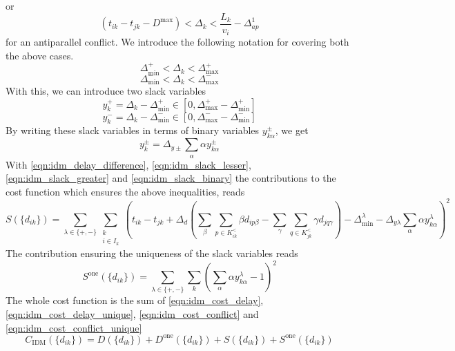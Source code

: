 \documentclass{article}
\begin{document}
or
\begin{equation*} \label{eqn:idm_slack_lesser_antiparallel}
     (t_{ik} - t_{jk} - D^{\text{max}}) < \Delta_k < \frac{L_k}{v_i} - \Delta^1_{ap}
\end{equation*}
for an antiparallel conflict.
We introduce the following notation for covering both the above cases.
\begin{equation*} \label{eqn:idm_slack_greater}
    \Delta^+_\text{min} < \Delta_k < \Delta^+_\text{max}
\end{equation*}
\begin{equation*} \label{eqn:idm_slack_lesser}
    \Delta^-_\text{min} < \Delta_k < \Delta^-_\text{max}
\end{equation*}
With this, we can introduce two slack variables
\begin{equation} \label{eqn:idm_slack_greater}
    y^+_k =  \Delta_k - \Delta^+_\text{min} \in [0, \Delta^+_\text{max} - \Delta^+_\text{min}]
\end{equation}
\begin{equation} \label{eqn:idm_slack_lesser}
    y^-_k =  \Delta_k - \Delta^-_\text{min} \in [0, \Delta^-_\text{max} - \Delta^-_\text{min}]
\end{equation}
By writing these slack variables in terms of binary variables $y^\pm_{k\alpha}$, we get
\begin{equation} \label{eqn:idm_slack_binary}
    y^\pm_k = \Delta_{y\pm} \sum_\alpha \alpha y^\pm_{k\alpha}
\end{equation}
With \eqref{eqn:idm_delay_difference}, \eqref{eqn:idm_slack_lesser}, \eqref{eqn:idm_slack_greater} and \eqref{eqn:idm_slack_binary} the contributions to the cost function which ensures the above inequalities, reads
\begin{equation} \label{eqn:idm_cost_conflict}
    S(\{d_{ik}\})  = \sum_{\lambda \in \{+, -\}} \sum_{\substack{k\\i\in I_k}} \left( t_{ik} - t_{jk} + \Delta_d \left( \sum_\beta \sum_{p\in K^<_{ik}} \beta d_{ip\beta}  - \sum_\gamma \sum_{q\in K^<_{jk}} \gamma d_{jq\gamma} \right) - \Delta^\lambda_\text{min} - \Delta_{y\lambda} \sum_\alpha \alpha y^\lambda_{k\alpha} \right)^2
\end{equation}
The contribution ensuring the uniqueness of the slack variables reads
\begin{equation} \label{eqn:idm_cost_conflict_unique}
    S^\text{one}(\{d_{ik}\})  = \sum_{\lambda \in \{+, -\}} \sum_k \left( \sum_\alpha \alpha y^\lambda_{k\alpha} - 1 \right)^2
\end{equation}
The whole cost function is the sum of \eqref{eqn:idm_cost_delay}, \eqref{eqn:idm_cost_delay_unique}, \eqref{eqn:idm_cost_conflict} and \eqref{eqn:idm_cost_conflict_unique}
\begin{equation*}
    C_\text{IDM}(\{d_{ik}\})  = D(\{d_{ik}\}) + D^\text{one}(\{d_{ik}\}) + S(\{d_{ik}\}) + S^\text{one}(\{d_{ik}\})
\end{equation*}
\end{document}
